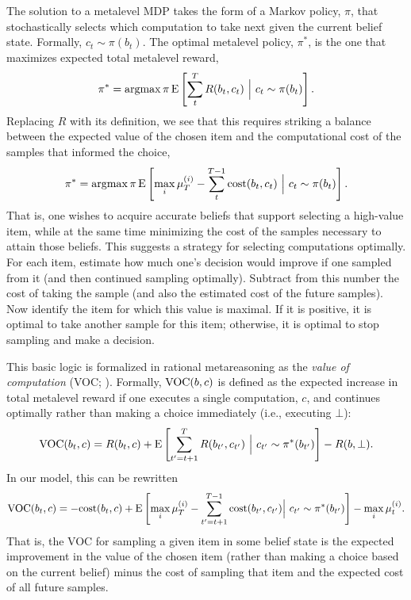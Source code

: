 The solution to a metalevel MDP takes the form of a Markov policy, $\pi$, that stochastically selects which computation to take next given the current belief state. Formally, $c_t \sim \pi(b_t)$. The optimal metalevel policy, $\pi^*$, is the one that maximizes expected total metalevel reward,
\begin{equation*}
  \pi^* = \operatorname*{argmax}{\pi} \operatorname*{E} \left[ \sum_t^T R(b_t, c_t) \ \Big\vert\ c_t \sim \pi(b_t) \right].
\end{equation*}
Replacing $R$ with its definition, we see that this requires striking a balance between the expected value of the chosen item and the computational cost of the samples that informed the choice,
\begin{equation*}
  \pi^* = \operatorname*{argmax}{\pi} \operatorname*{E} \left[
     \max_i \mu_T^{(i)} - \sum_t^{T-1} \text{cost}(b_t, c_t)
   \ \Big\vert\ c_t \sim \pi(b_t) \right].
\end{equation*}
That is, one wishes to acquire accurate beliefs that support selecting a high-value item, while at the same time minimizing the cost of the samples necessary to attain those beliefs. This suggests a strategy for selecting computations optimally. For each item, estimate how much one's decision would improve if one sampled from it (and then continued sampling optimally). Subtract from this number the cost of taking the sample (and also the estimated cost of the future samples). Now identify the item for which this value is maximal. If it is positive, it is optimal to take another sample for this item; otherwise, it is optimal to stop sampling and make a decision.

This basic logic is formalized in rational metareasoning as the \textit{value of computation} (VOC; \citealp{russell1991principles}). Formally, $\text{VOC}(b, c)$ is defined as the expected increase in total metalevel reward if one executes a single computation, $c$, and continues optimally rather than making a choice immediately (i.e., executing $\bot$):
$$
\text{VOC}(b_t, c) = R(b_t, c) + \operatorname*{E} \left[
  \sum_{t'=t+1}^T R(b_{t'}, c_{t'})\ \Big\vert\ c_{t'} \sim \pi^*(b_{t'}) 
\right] - R(b, \bot).
$$
In our model, this can be rewritten
$$
\text{VOC}(b_t, c) = -\text{cost}(b_t, c) + \operatorname*{E} \left[ 
  \max_i \mu_T^{(i)} - \sum_{t'=t+1}^{T-1} \text{cost}(b_{t'}, c_{t'})
  \Big\vert\ c_{t'} \sim \pi^*(b_{t'})
\right] -  \max_i \mu_t^{(i)}.
$$
That is, the VOC for sampling a given item in some belief state is the expected improvement in the value of the chosen item (rather than making a choice based on the current belief) minus the cost of sampling that item and the expected cost of all future samples.

